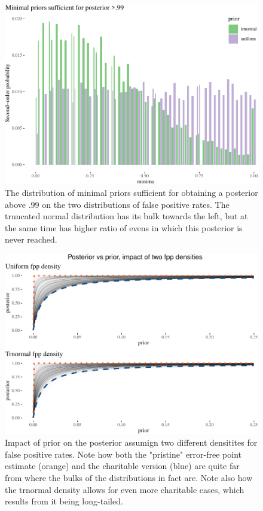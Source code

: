 \documentclass[
  10pt,
  dvipsnames,enabledeprecatedfontcommands]{scrartcl}
\begin{document}
\begin{figure}[H]



\begin{center}\includegraphics[width=0.8\linewidth]{imprecision_philosophical_paper._files/figure-latex/fig:fppMinima-1} \end{center}


\caption{The distribution of minimal priors sufficient for obtaining a posterior above .99 on the two distributions of false positive rates. The truncated normal distribution has its bulk towards the left, but at the same time has higher ratio of evens in which this posterior is never reached. }

\label{fig:fppMinima}

\end{figure}

\begin{figure}[H]

\begin{center}\includegraphics[width=0.8\linewidth]{imprecision_philosophical_paper._files/figure-latex/fig:fplinesPlot3-1} \end{center}
\caption{Impact of prior on the posterior assumign two different densitites for false positive rates. Note how both the "pristine" error-free point estimate (orange) and the charitable version (blue) are quite far from where the bulks of the distributions in fact are. Note also how the trnormal density allows for even more charitable cases, which results from it being long-tailed.}
\label{fig:fplinesPlot}
\end{figure}
\end{document}
